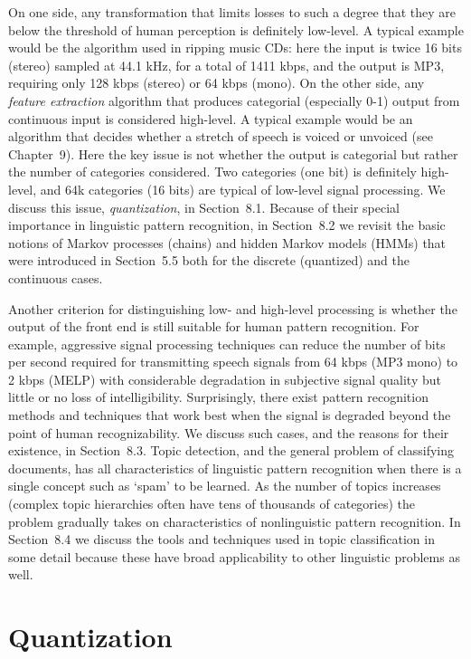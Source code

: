 On one side, any transformation that limits losses to such a degree that they
are below the threshold of human perception is definitely low-level. A typical
example would be the algorithm used in ripping music CDs: here the input is
twice 16 bits (stereo) sampled at 44.1 kHz, for a total of 1411 kbps, and the
output is MP3, requiring only 128 kbps (stereo) or 64 kbps (mono). On the
other side, any {\it feature extraction} algorithm that produces categorial
(especially 0-1) output from continuous input is considered high-level. A
typical example would be an algorithm that decides whether a stretch of speech
is voiced or unvoiced (see Chapter~9). Here the key issue is not whether the
output is categorial but rather the number of categories considered. Two
categories (one bit) is definitely high-level, and 64k categories (16 bits)
are typical of low-level signal processing. We discuss this issue, {\it
  quantization}, in Section~8.1.  Because of their special importance in
linguistic pattern recognition, in Section~8.2 we revisit the basic notions of
Markov processes (chains) and hidden Markov models (HMMs) that were introduced
in Section~5.5 both for the discrete (quantized) and the continuous cases.

Another criterion for distinguishing low- and high-level processing is whether
the output of the front end is still suitable for human pattern recognition.
For example, aggressive signal processing techniques can reduce the number of
bits per second required for transmitting speech signals from 64 kbps (MP3
mono) to 2 kbps (MELP) with considerable degradation in subjective signal
quality but little or no loss of intelligibility.  Surprisingly, there exist
pattern recognition methods and techniques that work best when the signal is
degraded beyond the point of human recognizability. We discuss such cases, and
the reasons for their existence, in Section~8.3. Topic detection, and the
general problem of classifying documents, has all characteristics of linguistic
pattern recognition when there is a single concept such as `spam' to be
learned. As the number of topics increases (complex topic hierarchies often
have tens of thousands of categories) the problem gradually takes on
characteristics of nonlinguistic pattern recognition. In Section~8.4 we
discuss the tools and techniques used in topic classification in some detail
because these have broad applicability to other linguistic problems as well.

\section{Quantization}

